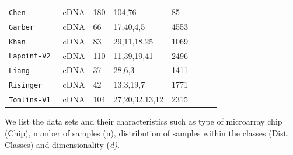 \documentclass[10pt]{bmc_article}
\newenvironment{bmcformat}{\begin{raggedright}\baselineskip20pt\sloppy\setboolean{publ}{false}}{\end{raggedright}\baselineskip20pt\sloppy}
\begin{document}
\begin{bmcformat}
\begin{table}[htp]
\begin{center}
\begin{footnotesize}
\begin{tabular}{llllllll}
{\tt Chen}~\cite{XinChen06012002}  &   cDNA  & 180 &   104,76 & 85 \\
{\tt Garber}~\cite{Garber2001}  & cDNA &  66  &  17,40,4,5 & 4553 \\
{\tt Khan}~\cite{Khan2001}  & cDNA  & 83  & 29,11,18,25 & 1069 \\
{\tt Lapoint-V2}~\cite{Lapointe2004} & cDNA  &  110 & 11,39,19,41 & 2496 \\
{\tt Liang}~\cite{Liang2005} &   cDNA & 37 & 28,6,3 & 1411 \\
{\tt Risinger}~\cite{Risinger2003b} & cDNA & 42 & 13,3,19,7 & 1771 \\
{\tt Tomlins-V1}~\cite{Tomlins2007} & cDNA  & 104 &  27,20,32,13,12 & 2315 \\

\hline
\end{tabular}
\end{footnotesize}
\end{center}
We list the data sets and their characteristics such as type of
microarray chip (Chip), number of samples (n), distribution of samples
within the classes (Dist. Classes) and dimensionality (\it{d}).
\end{table}








\end{bmcformat}
\end{document}
